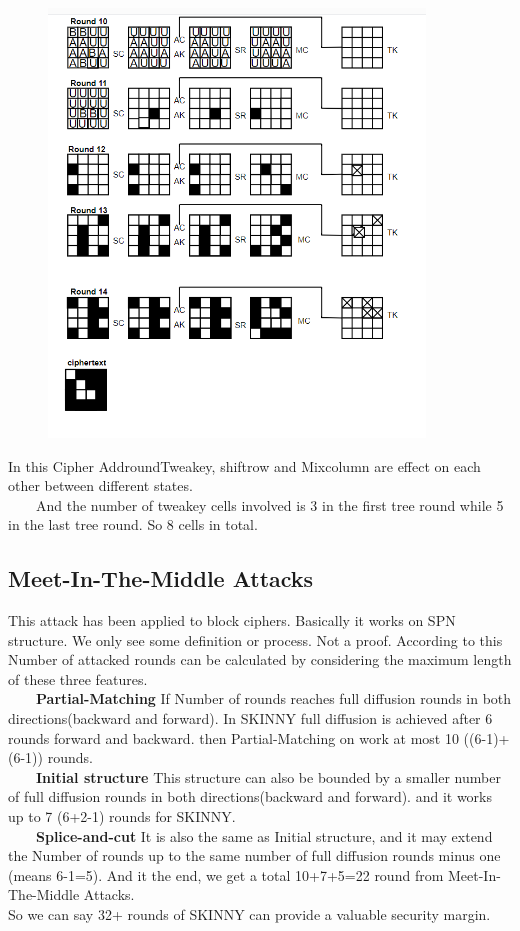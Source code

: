 \documentclass[preprint]{transcrypto}
\begin{document}
{\begin{figure}[H]
	\includegraphics[width=10cm]{fig6.png}
\end{figure}
In this Cipher AddroundTweakey, shiftrow and Mixcolumn are effect on each other between
different states.\\
\tab$\quad\quad$And the number of tweakey cells involved is 3 in the first tree round while 5 in the last tree
round. So 8 cells in total.
\subsection{Meet-In-The-Middle Attacks}
\tab This attack has been applied to block ciphers. Basically it works on SPN structure. We only see
some definition or process. Not a proof.
According to this Number of attacked rounds can be calculated by considering the maximum
length of these three features.\\
\tab$\quad\quad$\textbf{Partial-Matching} If Number of rounds reaches full diffusion rounds in both
directions(backward and forward). In SKINNY full diffusion is achieved after 6 rounds forward
and backward.
then Partial-Matching on work at most 10 ((6-1)+(6-1)) rounds.\\
\tab$\quad\quad$\textbf{Initial structure} This structure can also be bounded by a smaller number of full diffusion
rounds in both directions(backward and forward).
and it works up to 7 (6+2-1) rounds for SKINNY.\\
\tab$\quad\quad$\textbf{Splice-and-cut} It is also the same as Initial structure, and it may extend the Number of
rounds up to the same number of full diffusion rounds minus one (means 6-1=5). And it the end,
we get a total 10+7+5=22 round from Meet-In-The-Middle Attacks.\\
So we can say 32+ rounds of SKINNY can provide a valuable security margin.

}
\end{document}
